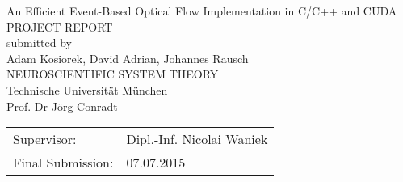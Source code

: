 \documentclass[a4paper,twoside, openright,12pt]{report}
\begin{document}
\pagestyle{empty}
\enlargethispage{4.5cm} %
\begin{center}
\phantom{u}
\vspace{0.5cm}
\Huge{\sc An Efficient Event-Based Optical Flow Implementation in C/C++ and CUDA}\\
\vspace{1.5cm}
		\large{
			PROJECT REPORT\\%
			\vspace{0.4cm}
			submitted by\\
			Adam Kosiorek,
			David Adrian,
			Johannes Rausch\\
			\vspace{1.5cm}
			NEUROSCIENTIFIC SYSTEM THEORY\\
			Technische Universit\"at M\"unchen\\
			\vspace{0.3cm}
			Prof. Dr J\"org Conradt\\
		}
\end{center}
\vspace{5.5cm}
\begin{tabular}{ll}
Supervisor: & Dipl.-Inf. Nicolai Waniek\\
Final Submission: &  07.07.2015 \\
\end{tabular}

\newpage
\end{document}
